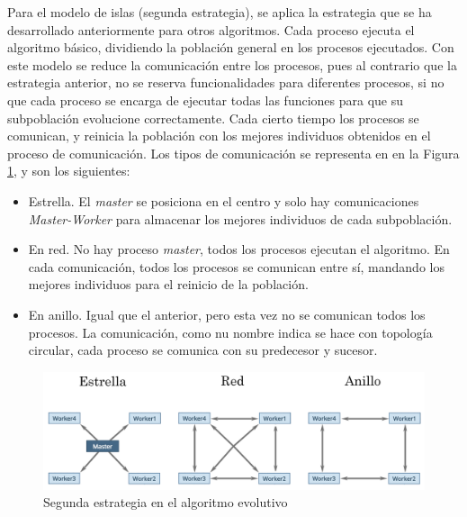 	Para el modelo de islas (segunda estrategia), se aplica la estrategia que se ha desarrollado anteriormente para otros algoritmos. Cada proceso ejecuta el algoritmo básico, dividiendo la población general en los procesos ejecutados. Con este modelo se reduce la comunicación entre los procesos, pues al contrario que la estrategia anterior, no se reserva funcionalidades para diferentes procesos, si no que cada proceso se encarga de ejecutar todas las funciones para que su subpoblación evolucione correctamente. Cada cierto tiempo los procesos se comunican, y reinicia la población con los mejores individuos obtenidos en el proceso de comunicación. Los tipos de comunicación se representa en en la Figura \ref{fig:pev3_mpi2}, y son los siguientes: 

	\begin{itemize}
		\item Estrella. El \textit{master} se posiciona en el centro y solo hay comunicaciones \textit{Master-Worker} para almacenar los mejores individuos de cada subpoblación.
		\item En red. No hay proceso \textit{master}, todos los procesos ejecutan el algoritmo. En cada comunicación, todos los procesos se comunican entre sí, mandando los mejores individuos para el reinicio de la población.
		\item En anillo. Igual que el anterior, pero esta vez no se comunican todos los procesos. La comunicación, como nu nombre indica se hace con topología circular, cada proceso se comunica con su predecesor y sucesor.
	\end{itemize}
	
	\begin{figure}[!h]
		\centering
		\includegraphics[width=\textwidth]{images/chapter_3/pev_mpi2}
		\caption{Segunda estrategia en el algoritmo evolutivo}
		\label{fig:pev3_mpi2}
	\end{figure}
	
